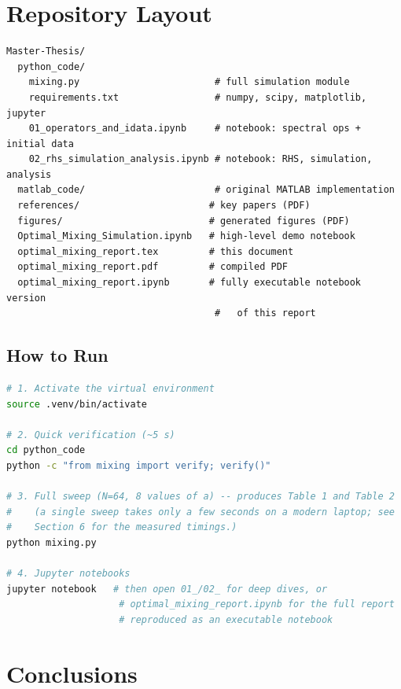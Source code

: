 \documentclass[12pt,a4paper]{article}
\theoremstyle{definition}
\theoremstyle{plain}
\begin{document}
\section{Repository Layout}
\label{sec:repo}

\begin{lstlisting}[language={}]
Master-Thesis/
  python_code/
    mixing.py                        # full simulation module
    requirements.txt                 # numpy, scipy, matplotlib, jupyter
    01_operators_and_idata.ipynb     # notebook: spectral ops + initial data
    02_rhs_simulation_analysis.ipynb # notebook: RHS, simulation, analysis
  matlab_code/                       # original MATLAB implementation
  references/                       # key papers (PDF)
  figures/                          # generated figures (PDF)
  Optimal_Mixing_Simulation.ipynb   # high-level demo notebook
  optimal_mixing_report.tex         # this document
  optimal_mixing_report.pdf         # compiled PDF
  optimal_mixing_report.ipynb       # fully executable notebook version
                                     #   of this report
\end{lstlisting}

\subsection*{How to Run}

\begin{lstlisting}[language=bash]
# 1. Activate the virtual environment
source .venv/bin/activate

# 2. Quick verification (~5 s)
cd python_code
python -c "from mixing import verify; verify()"

# 3. Full sweep (N=64, 8 values of a) -- produces Table 1 and Table 2
#    (a single sweep takes only a few seconds on a modern laptop; see
#    Section 6 for the measured timings.)
python mixing.py

# 4. Jupyter notebooks
jupyter notebook   # then open 01_/02_ for deep dives, or
                    # optimal_mixing_report.ipynb for the full report
                    # reproduced as an executable notebook
\end{lstlisting}

\section{Conclusions}
\label{sec:conc}
\end{document}
